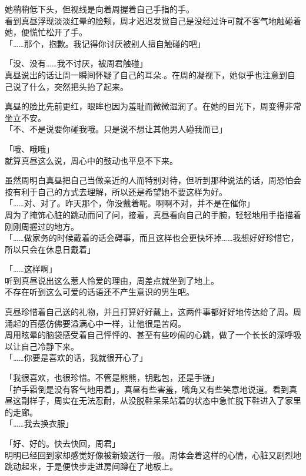 她稍稍低下头，但视线是向着周握着自己手指的手。\\

看到真昼浮现淡淡红晕的脸颊，周才迟迟发觉自己是没经过许可就不客气地触碰着她，便慌忙松开了手。\\

「……那个，抱歉。我记得你讨厌被别人擅自触碰的吧」

「没、没有……我不讨厌，被周君触碰」\\

真昼说出的话让周一瞬间怀疑了自己的耳朵.。在周的凝视下，她似乎也注意到自己说了什么，突然把头抬了起来。

真昼的脸比先前更红，眼眸也因为羞耻而微微湿润了。在她的目光下，周变得非常坐立不安。\\

「不、不是说要你碰我哦。只是说不想让其他男人碰我而已」

「哦、哦哦」\\

就算真昼这么说，周心中的鼓动也平息不下来。

虽然周明白真昼把自己当做亲近的人而特别对待，但听到那种说法的话，周恐怕会按有利于自己的方式去理解，所以还是希望她不要这样为好。\\

「……对、对了。昨天那个，你没戴着呢。啊啊不对，并不是在催你」\\

周为了掩饰心脏的跳动而问了问，接着，真昼看向自己的手腕，轻轻地用手指描着刚刚周握过的地方。\\

「……做家务的时候戴着的话会碍事，而且这样也会更快坏掉……我想好好珍惜它，所以只会在休息日戴着」

「……这样啊」\\

听到真昼说出这么惹人怜爱的理由，周差点就坐到了地上。\\

不存在听到这么可爱的话语还不产生意识的男生吧。

真昼珍惜着自己送的礼物，并且打算好好戴上，这两件事都好好地传达给了周。周涌起的百感仿佛要溢满心中一样，让他很是苦闷。\\

周用眩晕的脑袋感受着自己怦怦的、甚至有些吵闹的心跳，做了一个长长的深呼吸以让自己冷静下来。\\

「……你要是喜欢的话，我就很开心了」

「我很喜欢，也很珍惜。不管是熊熊，钥匙包，还是手链」\\

「护手霜倒是没有客气地用着」，真昼有些害羞，嘴角又有些笑意地说道。看到真昼这副样子，周实在无法忍耐，从没脱鞋呆呆站着的状态中急忙脱下鞋进入了家里的走廊。\\

「……我去换衣服」

「好、好的。快去快回，周君」\\

明明已经回到家却感觉好像被新娘送行一般。周体会着这样的心情，心脏又剧烈地跳动起来，于是便快步走进房间蹲在了地板上。

